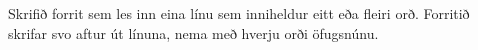 \begin{problem}
	Skrifið forrit sem les inn eina línu sem inniheldur eitt eða fleiri orð. Forritið skrifar svo aftur út línuna, nema með hverju orði öfugsnúnu.

\begin{example}
%
\end{example}
\begin{example}
%
\end{example}
\begin{example}
%
\end{example}
\end{problem}
